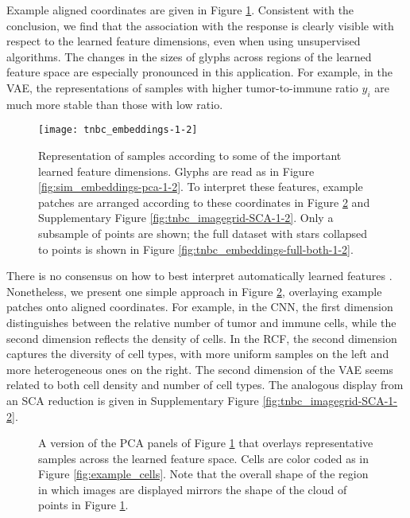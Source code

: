 Example aligned coordinates are given in Figure
\ref{fig:tnbc_embeddings-1-2}. Consistent with the conclusion, we find that
the association with the response is clearly visible with respect to the learned
feature dimensions, even when using unsupervised algorithms. The changes in the
sizes of glyphs across regions of the learned feature space are especially
pronounced in this application. For example, in the VAE, the representations of
samples with higher tumor-to-immune ratio $y_i$ are much more stable than those
with low ratio.

\begin{figure}
  \centering
  \texttt{[image: tnbc\_embeddings-1-2]}
  \caption{Representation of samples according to some of the important learned
    feature dimensions. Glyphs are read as in Figure
    \ref{fig:sim_embeddings-pca-1-2}. To interpret these features, example
    patches are arranged according to these coordinates in Figure
    \ref{fig:tnbc_imagegrid-PCA-1-2} and Supplementary Figure
    \ref{fig:tnbc_imagegrid-SCA-1-2}. Only a subsample of points are shown; the
    full dataset with stars collapsed to points is shown in Figure
    \ref{fig:tnbc_embeddings-full-both-1-2}.}
  \label{fig:tnbc_embeddings-1-2}
\end{figure}

There is no consensus on how to best interpret automatically learned features
\citep{doshi2017towards}. Nonetheless, we present one simple approach in Figure
\ref{fig:tnbc_imagegrid-PCA-1-2}, overlaying example patches onto aligned
coordinates. For example, in the CNN, the first dimension distinguishes between
the relative number of tumor and immune cells, while the second dimension
reflects the density of cells. In the RCF, the second dimension captures the
diversity of cell types, with more uniform samples on the left and more
heterogeneous ones on the right. The second dimension of the VAE seems related
to both cell density and number of cell types. The analogous display from an SCA
reduction is given in Supplementary Figure \ref{fig:tnbc_imagegrid-SCA-1-2}.

\begin{figure}
  \centering
  \caption{A version of the PCA panels of Figure \ref{fig:tnbc_embeddings-1-2}
    that overlays representative samples across the learned feature space. Cells
    are color coded as in Figure \ref{fig:example_cells}. Note that the overall
    shape of the region in which images are displayed mirrors the shape of the
    cloud of points in Figure \ref{fig:tnbc_embeddings-1-2}.}
  \label{fig:tnbc_imagegrid-PCA-1-2}
\end{figure}
